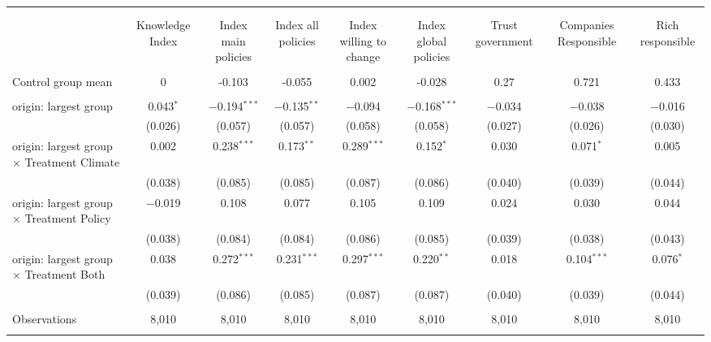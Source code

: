 
\begin{tabular}{@{\extracolsep{5pt}}lcccccccc} 
\\[-1.8ex]\hline 
\hline \\[-1.8ex] 
\\[-1.8ex] & Knowledge Index & Index main policies & Index all policies & Index willing to change & Index global policies & Trust government & Companies Responsible & Rich responsible \\ 
\hline \\[-1.8ex] 
 Control group mean & 0 & -0.103 & -0.055 & 0.002 & -0.028 & 0.27 & 0.721 & 0.433  \\ \hline \\[-1.8ex] origin: largest group & 0.043$^{*}$ & $-$0.194$^{***}$ & $-$0.135$^{**}$ & $-$0.094 & $-$0.168$^{***}$ & $-$0.034 & $-$0.038 & $-$0.016 \\ 
  & (0.026) & (0.057) & (0.057) & (0.058) & (0.058) & (0.027) & (0.026) & (0.030) \\ 
 origin: largest group $\times$ Treatment Climate & 0.002 & 0.238$^{***}$ & 0.173$^{**}$ & 0.289$^{***}$ & 0.152$^{*}$ & 0.030 & 0.071$^{*}$ & 0.005 \\
  & (0.038) & (0.085) & (0.085) & (0.087) & (0.086) & (0.040) & (0.039) & (0.044) \\ 
 origin: largest group $\times$ Treatment Policy & $-$0.019 & 0.108 & 0.077 & 0.105 & 0.109 & 0.024 & 0.030 & 0.044 \\ 
  & (0.038) & (0.084) & (0.084) & (0.086) & (0.085) & (0.039) & (0.038) & (0.043) \\ 
 origin: largest group $\times$ Treatment Both & 0.038 & 0.272$^{***}$ & 0.231$^{***}$ & 0.297$^{***}$ & 0.220$^{**}$ & 0.018 & 0.104$^{***}$ & 0.076$^{*}$ \\ 
  & (0.039) & (0.086) & (0.085) & (0.087) & (0.087) & (0.040) & (0.039) & (0.044) \\ 
\hline \\[-1.8ex] 

Observations & 8,010 & 8,010 & 8,010 & 8,010 & 8,010 & 8,010 & 8,010 & 8,010 \\ 
\hline 
\hline \\[-1.8ex] 
\end{tabular} 